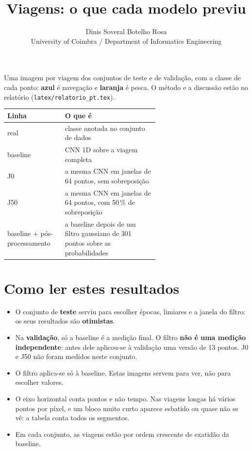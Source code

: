\documentclass[a4paper,11pt]{article}
\title{Viagens: o que cada modelo previu}
\author{Dinis Soveral Botelho Rosa\\University of Coimbra / Department of Informatics Engineering}
\date{}
\begin{document}
\maketitle

Uma imagem por viagem dos conjuntos de teste e de validação, com a classe de cada ponto: \textbf{azul} é navegação e \textbf{laranja} é pesca. O método e a discussão estão no relatório (\texttt{latex/relatorio\_pt.tex}).

{\centering\small
\begin{tabular}{lp{0.62\linewidth}}
\toprule
Linha & O que é \\
\midrule
real & classe anotada no conjunto de dados \\
baseline & CNN 1D sobre a viagem completa \\
J0 & a mesma CNN em janelas de 64 pontos, sem sobreposição \\
J50 & a mesma CNN em janelas de 64 pontos, com 50\,\% de sobreposição \\
baseline + pós-processamento & a baseline depois de um filtro gaussiano de 301 pontos sobre as probabilidades \\
\bottomrule
\end{tabular}\par}

\section*{Como ler estes resultados}

\begin{itemize}
\item O conjunto de \textbf{teste} serviu para escolher épocas, limiares e a janela do filtro: os seus resultados são \textbf{otimistas}.
\item Na \textbf{validação}, só a baseline é a medição final. O filtro \textbf{não é uma medição independente}: antes dele aplicou-se à validação uma versão de 13 pontos. J0 e J50 não foram medidos neste conjunto.
\item O filtro aplica-se só à baseline. Estas imagens servem para ver, não para escolher valores.
\item O eixo horizontal conta pontos e não tempo. Nas viagens longas há vários pontos por píxel, e um bloco muito curto aparece esbatido ou quase não se vê: a tabela conta todos os segmentos.
\item Em cada conjunto, as viagens estão por ordem crescente de exatidão da baseline.
\end{itemize}
\end{document}

